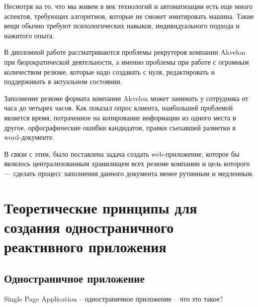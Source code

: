 \documentclass[14pt, a4paper]{diplom}
\begin{document}
\medskip

\tableofcontents[Содержание]


Несмотря на то, что мы живем в век технологий и автоматизации есть еще много аспектов,
требующих алгоритмов, которые не сможет имитировать машина. Такие вещи обычно требуют
психологических навыков, индивидуального подхода и нажитого опыта.

В дипломной работе рассматриваются проблемы рекрутеров компании
Akvelon при бюрократической деятельности,
а именно проблемы при работе с огромным количеством резюме, которые надо создавать с нуля, редактировать и
поддерживать в актуальном состоянии.

Заполнение резюме формата компании Akvelon
может занимать у сотрудника от часа до четырех часов. Как показал опрос клиента, наибольшей проблемой является время, потраченное
на копирование информации из одного места в другое, орфографические ошибки кандидатов, правки
съехавшей разметки в word-документе.

В связи с этим, было поставлена задача создать web-приложение, которое бы являлось централизованным хранилищем
всех резюме компании и цель которого — сделать процесс заполнения данного документа менее рутинным и медленным.

\chapter{Теоретические принципы для создания одностраничного реактивного приложения}

\section{Одностраничное приложение}
Single Page Application – одностраничное приложение – что это такое?
\end{document}
